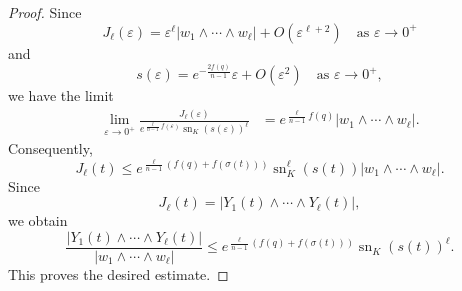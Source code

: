 \documentclass[10pt,a4paper]{amsart}
\begin{document}
\begin{proof}
Since
$$
J_\ell(\varepsilon)
=
\varepsilon^\ell |w_1\wedge\cdots\wedge w_\ell|
+
O(\varepsilon^{\ell+2}) \quad \text{as }\varepsilon \to 0^+
$$
and
$$
s(\varepsilon)
=
e^{-\frac{2f(q)}{n-1}}\varepsilon
+
O(\varepsilon^2) \quad \text{as } \varepsilon \to 0^+,
$$
we have the limit
\begin{align*}
\lim_{\varepsilon\to0^+}
\frac{J_\ell(\varepsilon)}
{e^{\frac{\ell}{n-1}f(\varepsilon)}
\operatorname{sn}_K(s(\varepsilon))^\ell}
&=
e^{\frac{\ell}{n-1}f(q)}
|w_1\wedge\cdots\wedge w_\ell|.
\end{align*}
Consequently,
$$
J_\ell(t)
\le
e^{\frac{\ell}{n-1}\left(f(q)+f(\sigma(t))\right)}
\operatorname{sn}_K^\ell(s(t))
|w_1\wedge\cdots\wedge w_\ell|.
$$
Since
$$
J_\ell(t)=|Y_1(t)\wedge\cdots\wedge Y_\ell(t)|,
$$
we obtain
$$
\frac{|Y_1(t)\wedge\cdots\wedge Y_\ell(t)|}
{|w_1\wedge\cdots\wedge w_\ell|}
\leq
e^{\frac{\ell}{n-1}\left(f(q)+f(\sigma(t))\right)}
\operatorname{sn}_K(s(t))^\ell .
$$
This proves the desired estimate.
\end{proof}
\end{document}

